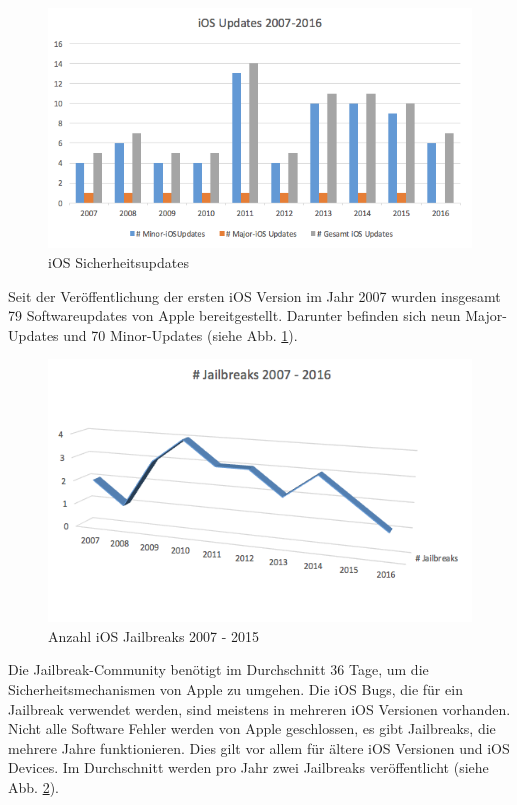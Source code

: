 \begin{figure}[ht!]
        \centering
                \includegraphics[scale=0.65]{Bilder/iOSUpdates1}
        \caption{iOS Sicherheitsupdates \cite{Apple[7]} \protect\footnotemark}
        	\label{fig:iOS Software Updates}
\end{figure}
Seit der Veröffentlichung der ersten iOS Version im Jahr 2007 wurden insgesamt 79 Softwareupdates von Apple bereitgestellt. Darunter befinden sich neun Major-Updates und 70  Minor-Updates (siehe Abb. \ref{fig:iOS Software Updates}).\par 
\begin{figure}[hb!]
        \centering
                \includegraphics[scale=0.8]{Bilder/AnzahlJB}
        \caption{Anzahl iOS Jailbreaks 2007 - 2015 \protect\footnotemark}
        	\label{fig:iOS Jailbreak}
\end{figure}
Die Jailbreak-Community benötigt im Durchschnitt 36 Tage, um die Sicherheitsmechanismen von Apple zu umgehen. Die iOS Bugs, die für ein Jailbreak verwendet werden, sind meistens in mehreren iOS Versionen vorhanden. Nicht alle Software Fehler werden von Apple geschlossen, es gibt Jailbreaks, die mehrere Jahre funktionieren. Dies gilt vor allem für ältere iOS Versionen und iOS Devices. Im Durchschnitt werden pro Jahr zwei Jailbreaks veröffentlicht (siehe Abb. \ref{fig:iOS Jailbreak}).
